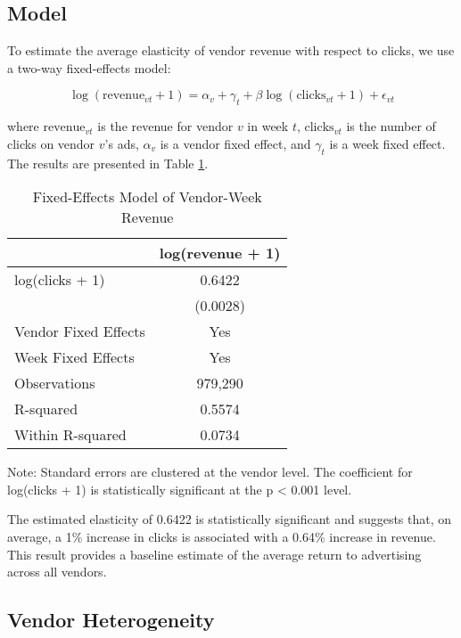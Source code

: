 \subsection*{Model}

To estimate the average elasticity of vendor revenue with respect to clicks, we use a two-way fixed-effects model:

\begin{equation}
\log(\text{revenue}_{vt} + 1) = \alpha_v + \gamma_t + \beta \log(\text{clicks}_{vt} + 1) + \epsilon_{vt}
\end{equation}

where $\text{revenue}_{vt}$ is the revenue for vendor $v$ in week $t$, $\text{clicks}_{vt}$ is the number of clicks on vendor $v$'s ads, $\alpha_v$ is a vendor fixed effect, and $\gamma_t$ is a week fixed effect. The results are presented in Table \ref{tab:vendor_fe_results}.

\begin{table}[htbp!]
\centering
\caption{Fixed-Effects Model of Vendor-Week Revenue}
\label{tab:vendor_fe_results}
\begin{tabular}{lc}
\toprule
 & log(revenue + 1) \\
\midrule
log(clicks + 1) & 0.6422 \\
 & (0.0028) \\
\midrule
Vendor Fixed Effects & Yes \\
Week Fixed Effects & Yes \\
Observations & 979,290 \\
R-squared & 0.5574 \\
Within R-squared & 0.0734 \\
\bottomrule
\end{tabular}
\end{table}

Note: Standard errors are clustered at the vendor level. The coefficient for log(clicks + 1) is statistically significant at the p < 0.001 level.

The estimated elasticity of 0.6422 is statistically significant and suggests that, on average, a 1\% increase in clicks is associated with a 0.64\% increase in revenue. This result provides a baseline estimate of the average return to advertising across all vendors.

\subsection*{Vendor Heterogeneity}

